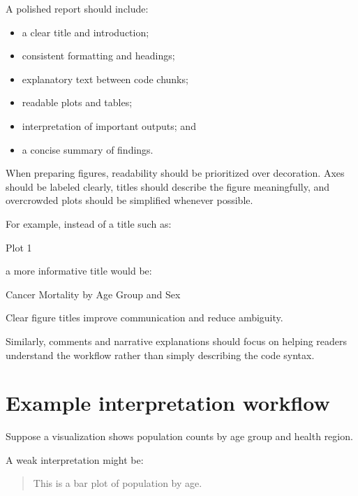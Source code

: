 \documentclass[
  11pt,
  oneside]{book}
\newenvironment{Shaded}{\begin{snugshade}}{\end{snugshade}}
\newcommand{\NormalTok}[1]{#1}
\providecommand{\tightlist}{%
  \setlength{\itemsep}{0pt}\setlength{\parskip}{0pt}}
\begin{document}
A polished report should include:

\begin{itemize}
\tightlist
\item
  a clear title and introduction;
\item
  consistent formatting and headings;
\item
  explanatory text between code chunks;
\item
  readable plots and tables;
\item
  interpretation of important outputs; and
\item
  a concise summary of findings.
\end{itemize}

When preparing figures, readability should be prioritized over decoration. Axes should be labeled clearly, titles should describe the figure meaningfully, and overcrowded plots should be simplified whenever possible.

For example, instead of a title such as:

\begin{Shaded}
\begin{Highlighting}[]
\NormalTok{Plot 1}
\end{Highlighting}
\end{Shaded}

a more informative title would be:

\begin{Shaded}
\begin{Highlighting}[]
\NormalTok{Cancer Mortality by Age Group and Sex}
\end{Highlighting}
\end{Shaded}

Clear figure titles improve communication and reduce ambiguity.

Similarly, comments and narrative explanations should focus on helping readers understand the workflow rather than simply describing the code syntax.

\section{Example interpretation workflow}\label{example-interpretation-workflow}

Suppose a visualization shows population counts by age group and health region.

A weak interpretation might be:

\begin{quote}
This is a bar plot of population by age.
\end{quote}
\end{document}
